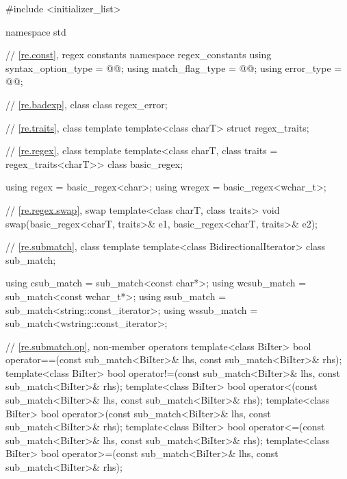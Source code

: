 %
%
%
%
\begin{codeblock}
#include <initializer_list>

namespace std {
  // \ref{re.const}, regex constants
  namespace regex_constants {
    using syntax_option_type = @@;
    using match_flag_type = @@;
    using error_type = @@;
  }

  // \ref{re.badexp}, class 
  class regex_error;

  // \ref{re.traits}, class template 
  template<class charT> struct regex_traits;

  // \ref{re.regex}, class template 
  template<class charT, class traits = regex_traits<charT>> class basic_regex;

  using regex  = basic_regex<char>;
  using wregex = basic_regex<wchar_t>;

  // \ref{re.regex.swap},  swap
  template<class charT, class traits>
    void swap(basic_regex<charT, traits>& e1, basic_regex<charT, traits>& e2);

  // \ref{re.submatch}, class template 
  template<class BidirectionalIterator>
    class sub_match;

  using csub_match  = sub_match<const char*>;
  using wcsub_match = sub_match<const wchar_t*>;
  using ssub_match  = sub_match<string::const_iterator>;
  using wssub_match = sub_match<wstring::const_iterator>;

  // \ref{re.submatch.op},  non-member operators
  template<class BiIter>
    bool operator==(const sub_match<BiIter>& lhs, const sub_match<BiIter>& rhs);
  template<class BiIter>
    bool operator!=(const sub_match<BiIter>& lhs, const sub_match<BiIter>& rhs);
  template<class BiIter>
    bool operator<(const sub_match<BiIter>& lhs, const sub_match<BiIter>& rhs);
  template<class BiIter>
    bool operator>(const sub_match<BiIter>& lhs, const sub_match<BiIter>& rhs);
  template<class BiIter>
    bool operator<=(const sub_match<BiIter>& lhs, const sub_match<BiIter>& rhs);
  template<class BiIter>
    bool operator>=(const sub_match<BiIter>& lhs, const sub_match<BiIter>& rhs);

}
\end{codeblock}
